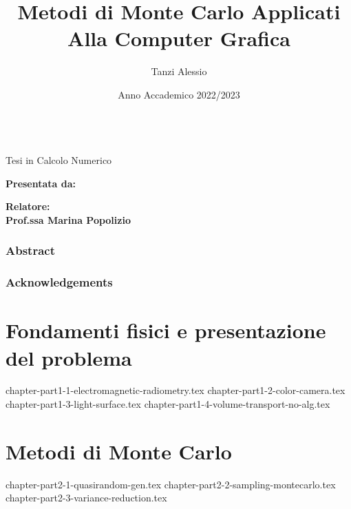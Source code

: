 \documentclass[12pt, openany]{book}
\title{Metodi di Monte Carlo Applicati Alla Computer Grafica}
\author{Tanzi Alessio}
\date{Anno Accademico 2022/2023}
\theoremstyle{theoremdd}
\newcommand{\professor}{Prof.ssa Marina Popolizio}
\begin{document}
	\begin{titlepage}
		\begin{center}
			\vspace*{1cm}
			{\Huge \bfseries \thetitle}\\ %
			\vspace*{1cm}
			{\Large Tesi in Calcolo Numerico}
		\end{center}
		\vspace*{1cm}
		\begin{flushright}
			{\Large\bfseries Presentata da:\\\theauthor}
		\end{flushright}
		\begin{flushleft}
			{\Large\bfseries Relatore:\\\professor} 
		\end{flushleft}
		\vspace*{1cm}
		\begin{center}
			{\Large\thedate}
		\end{center}
	\end{titlepage}

	\frontmatter
	\section*{Abstract}

	\section*{Acknowledgements}

	\tableofcontents

	\mainmatter
	\part{Fondamenti fisici e presentazione del problema}
	{chapter-part1-1-electromagnetic-radiometry.tex}
	{chapter-part1-2-color-camera.tex}
	{chapter-part1-3-light-surface.tex}
	{chapter-part1-4-volume-transport-no-alg.tex}

	\part{Metodi di Monte Carlo}
	{chapter-part2-1-quasirandom-gen.tex}
	{chapter-part2-2-sampling-montecarlo.tex}
	{chapter-part2-3-variance-reduction.tex}
\end{document}
